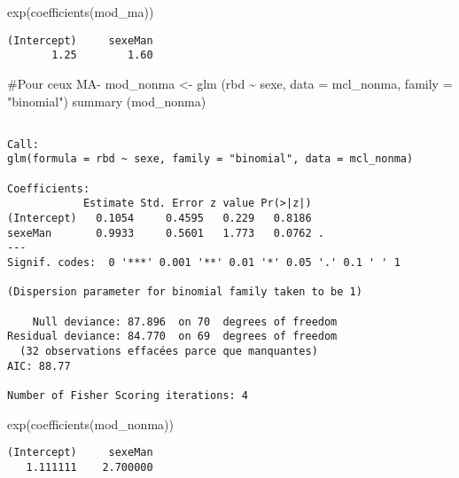 \documentclass[
  letterpaper,
  DIV=11,
  numbers=noendperiod]{scrartcl}
\newenvironment{Shaded}{\begin{snugshade}}{\end{snugshade}}
\newcommand{\AttributeTok}[1]{\textcolor[rgb]{0.40,0.45,0.13}{#1}}
\newcommand{\CommentTok}[1]{\textcolor[rgb]{0.37,0.37,0.37}{#1}}
\newcommand{\FunctionTok}[1]{\textcolor[rgb]{0.28,0.35,0.67}{#1}}
\newcommand{\NormalTok}[1]{\textcolor[rgb]{0.00,0.23,0.31}{#1}}
\newcommand{\OtherTok}[1]{\textcolor[rgb]{0.00,0.23,0.31}{#1}}
\newcommand{\SpecialCharTok}[1]{\textcolor[rgb]{0.37,0.37,0.37}{#1}}
\newcommand{\StringTok}[1]{\textcolor[rgb]{0.13,0.47,0.30}{#1}}
\begin{document}
\begin{Shaded}
\begin{Highlighting}[]
\FunctionTok{exp}\NormalTok{(}\FunctionTok{coefficients}\NormalTok{(mod\_ma))}
\end{Highlighting}
\end{Shaded}

\begin{verbatim}
(Intercept)     sexeMan 
       1.25        1.60 
\end{verbatim}

\begin{Shaded}
\begin{Highlighting}[]
\CommentTok{\#Pour ceux MA{-}}
\NormalTok{mod\_nonma }\OtherTok{\textless{}{-}} \FunctionTok{glm}\NormalTok{ (rbd }\SpecialCharTok{\textasciitilde{}}\NormalTok{ sexe, }\AttributeTok{data =}\NormalTok{ mcl\_nonma, }\AttributeTok{family =} \StringTok{"binomial"}\NormalTok{)}
\FunctionTok{summary}\NormalTok{ (mod\_nonma)}
\end{Highlighting}
\end{Shaded}

\begin{verbatim}

Call:
glm(formula = rbd ~ sexe, family = "binomial", data = mcl_nonma)

Coefficients:
            Estimate Std. Error z value Pr(>|z|)  
(Intercept)   0.1054     0.4595   0.229   0.8186  
sexeMan       0.9933     0.5601   1.773   0.0762 .
---
Signif. codes:  0 '***' 0.001 '**' 0.01 '*' 0.05 '.' 0.1 ' ' 1

(Dispersion parameter for binomial family taken to be 1)

    Null deviance: 87.896  on 70  degrees of freedom
Residual deviance: 84.770  on 69  degrees of freedom
  (32 observations effacées parce que manquantes)
AIC: 88.77

Number of Fisher Scoring iterations: 4
\end{verbatim}

\begin{Shaded}
\begin{Highlighting}[]
\FunctionTok{exp}\NormalTok{(}\FunctionTok{coefficients}\NormalTok{(mod\_nonma))}
\end{Highlighting}
\end{Shaded}

\begin{verbatim}
(Intercept)     sexeMan 
   1.111111    2.700000 
\end{verbatim}
\end{document}
